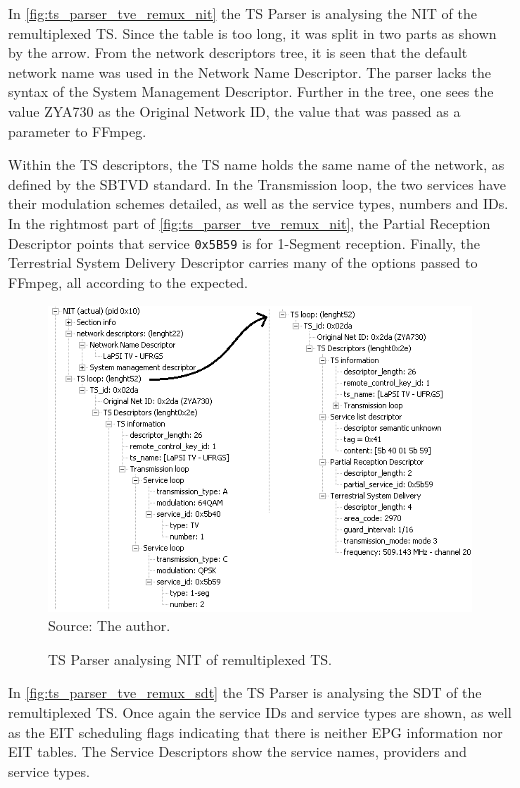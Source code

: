 \documentclass[
	12pt,				%
	openright,			%
	twoside,			%
	a4paper,			%
	brazil,
	french,				%
	english
	]{abntex2}
\begin{document}
In \autoref{fig:ts_parser_tve_remux_nit} the TS Parser is analysing the NIT of the remultiplexed TS. Since the table is too long, it was split in two parts as shown by the arrow. From the network descriptors tree, it is seen that the default network name was used in the Network Name Descriptor. The parser lacks the syntax of the System Management Descriptor. Further in the tree, one sees the value ZYA730 as the Original Network ID, the value that was passed as a parameter to FFmpeg.

Within the TS descriptors, the TS name holds the same name of the network, as defined by the SBTVD standard. In the Transmission loop, the two services have their modulation schemes detailed, as well as the service types, numbers and IDs. In the rightmost part of \autoref{fig:ts_parser_tve_remux_nit}, the Partial Reception Descriptor points that service \texttt{0x5B59} is for 1-Segment reception. Finally, the Terrestrial System Delivery Descriptor carries many of the options passed to FFmpeg, all according to the expected.

\begin{figure}[!h]
\centering
\caption{TS Parser analysing NIT of remultiplexed TS.}
\includegraphics[width=0.9\linewidth]{figuras/ts_parser_tve_remux_nit.png}
\\Source: The author.
\label{fig:ts_parser_tve_remux_nit}
\end{figure}

In \autoref{fig:ts_parser_tve_remux_sdt} the TS Parser is analysing the SDT of the remultiplexed TS. Once again the service IDs and service types are shown, as well as the EIT scheduling flags indicating that there is neither EPG information nor EIT tables. The Service Descriptors show the service names, providers and service types.
\end{document}
